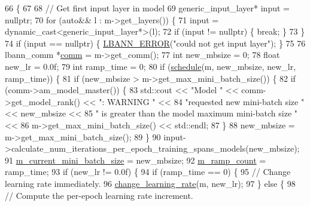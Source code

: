 \begin{DoxyCode}
66                                                              \{
67 
68   \textcolor{comment}{// Get first input layer in model}
69   generic\_input\_layer* input = \textcolor{keyword}{nullptr};
70   \textcolor{keywordflow}{for} (\textcolor{keyword}{auto}&& l : m->get\_layers()) \{
71     input = \textcolor{keyword}{dynamic\_cast<}generic\_input\_layer*\textcolor{keyword}{>}(l);
72     \textcolor{keywordflow}{if} (input != \textcolor{keyword}{nullptr}) \{ \textcolor{keywordflow}{break}; \}
73   \}
74   \textcolor{keywordflow}{if} (input == \textcolor{keyword}{nullptr}) \{ \hyperlink{base_8hpp_a80b1d707117e968a6951b7222e4b2b87}{LBANN\_ERROR}(\textcolor{stringliteral}{"could not get input layer"}); \}
75 
76   lbann\_comm *\hyperlink{file__io_8cpp_ab048c6f9fcbcfaa57ce68b00263dbebe}{comm} = m->get\_comm();
77   \textcolor{keywordtype}{int} new\_mbsize = 0;
78   \textcolor{keywordtype}{float} new\_lr = 0.0f;
79   \textcolor{keywordtype}{int} ramp\_time = 0;
80   \textcolor{keywordflow}{if} (\hyperlink{classlbann_1_1lbann__callback__variable__minibatch_ace13e8941491ddd28ef35c277cecb1ad}{schedule}(m, new\_mbsize, new\_lr, ramp\_time)) \{
81     \textcolor{keywordflow}{if} (new\_mbsize > m->get\_max\_mini\_batch\_size()) \{
82       \textcolor{keywordflow}{if} (comm->am\_model\_master()) \{
83         std::cout << \textcolor{stringliteral}{"Model "} << comm->get\_model\_rank() << \textcolor{stringliteral}{": WARNING "} <<
84           \textcolor{stringliteral}{"requested new mini-batch size "} << new\_mbsize <<
85           \textcolor{stringliteral}{" is greater than the model maximum mini-batch size "} <<
86           m->get\_max\_mini\_batch\_size() << std::endl;
87       \}
88       new\_mbsize = m->get\_max\_mini\_batch\_size();
89     \}
90     input->calculate\_num\_iterations\_per\_epoch\_training\_spans\_models(new\_mbsize);
91     \hyperlink{classlbann_1_1lbann__callback__variable__minibatch_a6488bd1f45110a1cb22553e5035003de}{m\_current\_mini\_batch\_size} = new\_mbsize;
92     \hyperlink{classlbann_1_1lbann__callback__variable__minibatch_a7beea78ef7107c88cb8782d3af618117}{m\_ramp\_count} = ramp\_time;
93     \textcolor{keywordflow}{if} (new\_lr != 0.0f) \{
94       \textcolor{keywordflow}{if} (ramp\_time == 0) \{
95         \textcolor{comment}{// Change learning rate immediately.}
96         \hyperlink{classlbann_1_1lbann__callback__variable__minibatch_af078f30f9c206b89bdd542ce1fc6d2ad}{change\_learning\_rate}(m, new\_lr);
97       \} \textcolor{keywordflow}{else} \{
98         \textcolor{comment}{// Compute the per-epoch learning rate increment.}

\end{DoxyCode}
